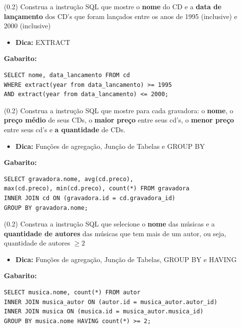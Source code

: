\documentclass[12pt]{exam}
\begin{document}
\begin{questions}
\question (0.2)  Construa a instrução SQL que mostre o \textbf{nome} do CD e a \textbf{data de lançamento} dos CD's que foram lançados entre os anos de 1995 (inclusive) e 2000 (inclusive)

\begin{itemize}
    \item \textbf{Dica:} EXTRACT
\end{itemize}

\textbf{Gabarito:}
\begin{verbatim}
SELECT nome, data_lancamento FROM cd 
WHERE extract(year from data_lancamento) >= 1995 
AND extract(year from data_lancamento) <= 2000;
\end{verbatim}



\question (0.2) Construa a instrução SQL que mostre para cada gravadora: o \textbf{nome}, o \textbf{preço médio} de seus CDs, o \textbf{maior preço} entre seus cd's, o \textbf{menor preço} entre seus cd's e \textbf{a quantidade} de CDs.

\begin{itemize}
    \item \textbf{Dica:} Funções de agregação, Junção de Tabelas e GROUP BY
\end{itemize}

\textbf{Gabarito:}
\begin{verbatim}
SELECT gravadora.nome, avg(cd.preco), 
max(cd.preco), min(cd.preco), count(*) FROM gravadora 
INNER JOIN cd ON (gravadora.id = cd.gravadora_id)
GROUP BY gravadora.nome;
\end{verbatim}

\question (0.2) Construa a instrução SQL que selecione o \textbf{nome} das músicas e a \textbf{quantidade de autores} das músicas que tem mais de um autor, ou seja, quantidade de autores $\geq 2$

\begin{itemize}
    \item \textbf{Dica:} Funções de agregação, Junção de Tabelas, GROUP BY e HAVING
\end{itemize}

\textbf{Gabarito:}
\begin{verbatim}
SELECT musica.nome, count(*) FROM autor 
INNER JOIN musica_autor ON (autor.id = musica_autor.autor_id) 
INNER JOIN musica ON (musica.id = musica_autor.musica_id) 
GROUP BY musica.nome HAVING count(*) >= 2;
\end{verbatim}


\end{questions}
\end{document}
